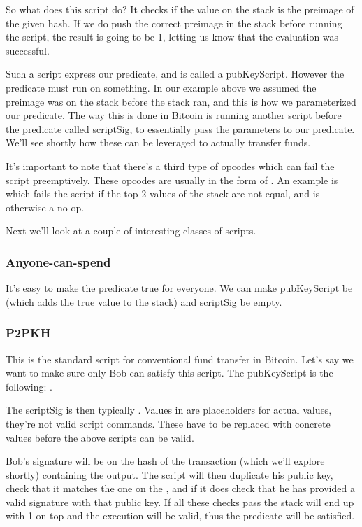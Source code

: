 So what does this script do? It checks if the value on the stack is the preimage of the given hash. If we do push the correct preimage in the stack before running the script, the result is going to be 1, letting us know that the evaluation was successful.

Such a script express our predicate, and is called a \textsf{pubKeyScript}. However the predicate must run on something. In our example above we assumed the preimage was on the stack before the stack ran, and this is how we parameterized our predicate. The way this is done in Bitcoin is running another script before the predicate called \textsf{scriptSig}, to essentially pass the parameters to our predicate. We'll see shortly how these can be leveraged to actually transfer funds.

It's important to note that there's a third type of opcodes which can fail the script preemptively. These opcodes are usually in the form of . An example is  which fails the script if the top 2 values of the stack are not equal, and is otherwise a no-op.

Next we'll look at a couple of interesting classes of scripts.

\subsubsection{Anyone-can-spend}
It's easy to make the predicate true for everyone. We can make \textsf{pubKeyScript} be  (which adds the true value to the stack) and \textsf{scriptSig} be empty.

\subsubsection{P2PKH}
This is the standard script for conventional fund transfer in Bitcoin. Let's say we want to make sure only Bob can satisfy this script. The \textsf{pubKeyScript} is the following: .

The \textsf{scriptSig} is then typically . Values in \code{<>} are placeholders for actual values, they're not valid script commands. These have to be replaced with concrete values before the above scripts can be valid.

Bob's signature will be on the hash of the transaction (which we'll explore shortly) containing the output. The script will then duplicate his public key, check that it matches the one on the , and if it does check that he has provided a valid signature with that public key. If all these checks pass the stack will end up with 1 on top and the execution will be valid, thus the predicate will be satisfied.

